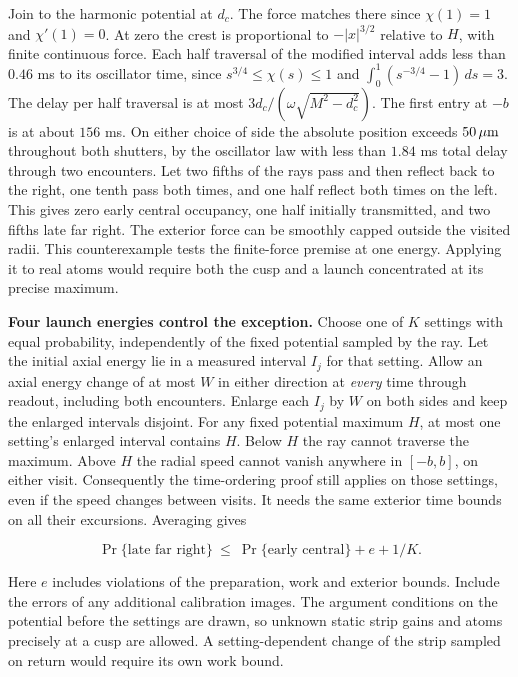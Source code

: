 \documentclass[11pt,a4paper]{article}
\begin{document}
Join to the harmonic potential at \(d_c\). The force matches there since
\(\chi(1)=1\) and \(\chi'(1)=0\). At zero the crest is proportional to
\(-|x|^{3/2}\) relative to \(H\), with finite continuous force. Each
half traversal of the modified interval adds less than \(0.46\) ms to
its oscillator time, since \(s^{3/4}\le\chi(s)\le1\) and
\(\int_0^1(s^{-3/4}-1)\,ds=3\). The delay per half traversal is at most
\(3d_c/(\omega\sqrt{M^2-d_c^2})\). The first entry at \(-b\) is at about
\(156\) ms. On either choice of side the absolute position exceeds
\(50\,\mu{\rm m}\) throughout both shutters, by the oscillator law with
less than \(1.84\) ms total delay through two encounters. Let two fifths
of the rays pass and then reflect back to the right, one tenth pass both
times, and one half reflect both times on the left. This gives zero
early central occupancy, one half initially transmitted, and two fifths
late far right. The exterior force can be smoothly capped outside the
visited radii. This counterexample tests the finite-force premise at one
energy. Applying it to real atoms would require both the cusp and a
launch concentrated at its precise maximum.

\textbf{Four launch energies control the exception.} Choose one of \(K\)
settings with equal probability, independently of the fixed potential
sampled by the ray. Let the initial axial energy lie in a measured
interval \(I_j\) for that setting. Allow an axial energy change of at
most \(W\) in either direction at \emph{every} time through readout,
including both encounters. Enlarge each \(I_j\) by \(W\) on both sides
and keep the enlarged intervals disjoint. For any fixed potential
maximum \(H\), at most one setting's enlarged interval contains \(H\).
Below \(H\) the ray cannot traverse the maximum. Above \(H\) the radial
speed cannot vanish anywhere in \([-b,b]\), on either visit.
Consequently the time-ordering proof still applies on those settings,
even if the speed changes between visits. It needs the same exterior
time bounds on all their excursions. Averaging gives

\[
 \Pr\{\text{late far right}\}
 \ \le\ \Pr\{\text{early central}\}+e+1/K .
\]

Here \(e\) includes violations of the preparation, work and exterior
bounds. Include the errors of any additional calibration images. The
argument conditions on the potential before the settings are drawn, so
unknown static strip gains and atoms precisely at a cusp are allowed. A
setting-dependent change of the strip sampled on return would require
its own work bound.
\end{document}
